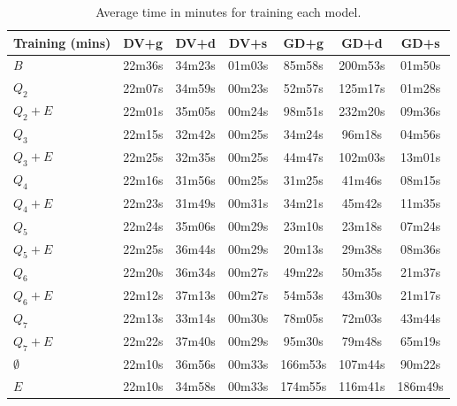 \begin{table}[h]
  \centering
  \begin{tabular}{l|c|c|c|c|c|c}
    \hline
    \multicolumn{1}{c}{\bfseries Training (mins)} & \multicolumn{1}{c}{\bfseries DV+g} &
    \multicolumn{1}{c}{\bfseries DV+d} & \multicolumn{1}{c}{\bfseries DV+s} &
    \multicolumn{1}{c}{\bfseries GD+g} & \multicolumn{1}{c}{\bfseries GD+d} &
    \multicolumn{1}{c}{\bfseries GD+s}\\
    \hline
    $B$         & 22m36s & 34m23s & 01m03s & 85m58s & 200m53s& 01m50s \\
    $Q_2$       & 22m07s & 34m59s & 00m23s & 52m57s & 125m17s& 01m28s \\
    $Q_2+E$     & 22m01s & 35m05s & 00m24s & 98m51s & 232m20s& 09m36s \\
    $Q_3$       & 22m15s & 32m42s & 00m25s & 34m24s & 96m18s & 04m56s \\
    $Q_3+E$     & 22m25s & 32m35s & 00m25s & 44m47s & 102m03s& 13m01s \\
    $Q_4$       & 22m16s & 31m56s & 00m25s & 31m25s & 41m46s & 08m15s \\
    $Q_4+E$     & 22m23s & 31m49s & 00m31s & 34m21s & 45m42s & 11m35s \\
    $Q_5$       & 22m24s & 35m06s & 00m29s & 23m10s & 23m18s & 07m24s \\
    $Q_5+E$     & 22m25s & 36m44s & 00m29s & 20m13s & 29m38s & 08m36s \\
    $Q_6$       & 22m20s & 36m34s & 00m27s & 49m22s & 50m35s & 21m37s \\
    $Q_6+E$     & 22m12s & 37m13s & 00m27s & 54m53s & 43m30s & 21m17s \\
    $Q_7$       & 22m13s & 33m14s & 00m30s & 78m05s & 72m03s & 43m44s \\
    $Q_7+E$     & 22m22s & 37m40s & 00m29s & 95m30s & 79m48s & 65m19s \\
    $\emptyset$ & 22m10s & 36m56s & 00m33s &166m53s & 107m44s& 90m22s \\
    $E$         & 22m10s & 34m58s & 00m33s &174m55s & 116m41s& 186m49s\\
  \end{tabular}
  \caption{Average time in minutes for training each model.\label{tab:time-training}}
\end{table}

